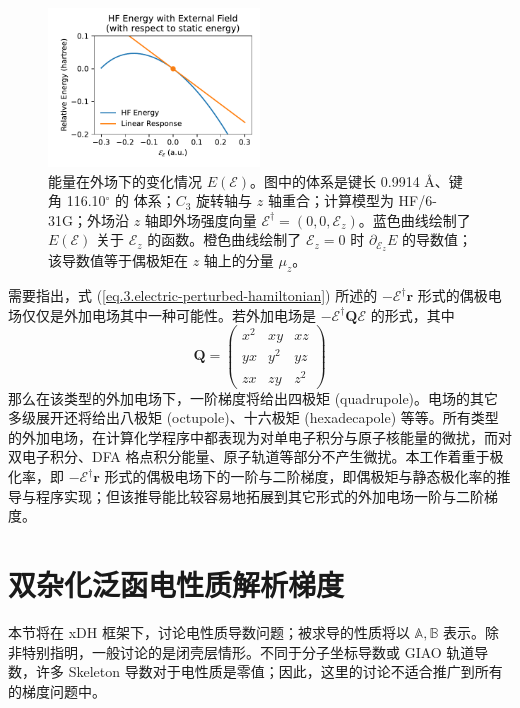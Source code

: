 \begin{figure}
  \centering
  \caption{能量在外场下的变化情况 $E(\pmb{\mathcal{E}})$。图中的体系是键长 0.9914 \AA、键角 116.10$^\circ$ 的  体系；$C_3$ 旋转轴与 $z$ 轴重合；计算模型为 HF/6-31G；外场沿 $z$ 轴即外场强度向量 $\pmb{\mathcal{E}}^\dagger = (0, 0, \mathcal{E}_z)$。蓝色曲线绘制了 $E(\pmb{\mathcal{E}})$ 关于 $\mathcal{E}_z$ 的函数。橙色曲线绘制了 $\mathcal{E}_z = 0$ 时 $\partial_{\mathcal{E}_z} E$ 的导数值；该导数值等于偶极矩在 $z$ 轴上的分量 $\mu_z$。}
  \label{fig.3.NumDipole-z}
  \includegraphics[width=0.5\textwidth]{assets/NumDipole-z.pdf}
\end{figure}

需要指出，式 (\ref{eq.3.electric-perturbed-hamiltonian}) 所述的 $- \pmb{\mathcal{E}}^\dagger \bm{r}$ 形式的偶极电场仅仅是外加电场其中一种可能性。若外加电场是 $- \pmb{\mathcal{E}}^\dagger \bm{Q} \pmb{\mathcal{E}}$ 的形式，其中
\begin{equation*}
  \bm{Q} =
  \begin{pmatrix}
    x^2 & xy & xz \\
    yx & y^2 & yz \\
    zx & zy & z^2
  \end{pmatrix}
\end{equation*}
那么在该类型的外加电场下，一阶梯度将给出四极矩 (quadrupole)。电场的其它多级展开还将给出八极矩 (octupole)、十六极矩 (hexadecapole) 等等。所有类型的外加电场，在计算化学程序中都表现为对单电子积分与原子核能量的微扰，而对双电子积分、DFA 格点积分能量、原子轨道等部分不产生微扰。本工作着重于极化率，即 $- \pmb{\mathcal{E}}^\dagger \bm{r}$ 形式的偶极电场下的一阶与二阶梯度，即偶极矩与静态极化率的推导与程序实现；但该推导能比较容易地拓展到其它形式的外加电场一阶与二阶梯度。

\section{双杂化泛函电性质解析梯度}
\label{sec.3.3.theory}

本节将在 xDH 框架下，讨论电性质导数问题；被求导的性质将以 $\mathbb{A}, \mathbb{B}$ 表示。除非特别指明，一般讨论的是闭壳层情形。不同于分子坐标导数或 GIAO 轨道导数，许多 Skeleton 导数对于电性质是零值；因此，这里的讨论不适合推广到所有的梯度问题中。

